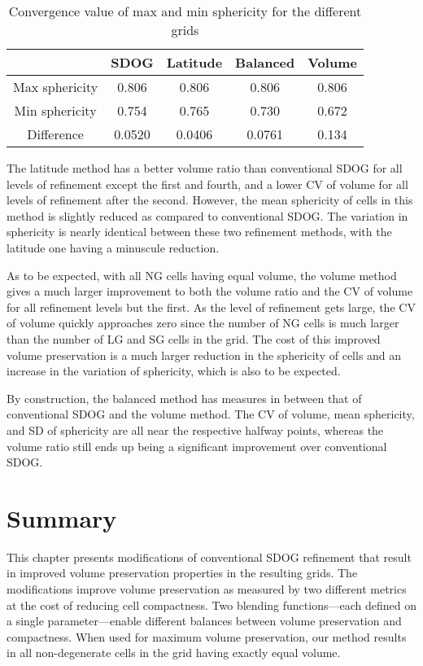 \begin{table}[htp!]
	\centering
	\caption[Convergence values of max and min sphericity for the different grids]{
		Convergence value of max and min sphericity for the different grids
	}
	\begin{tabular}{@{} c c c c c @{}}
		\toprule
		& SDOG   & Latitude & Balanced & Volume \\ \midrule
		Max sphericity & 0.806  & 0.806    & 0.806    & 0.806  \\
		Min sphericity & 0.754  & 0.765    & 0.730    & 0.672  \\
		Difference     & 0.0520 & 0.0406   & 0.0761   & 0.134  \\ \bottomrule
	\end{tabular}
	\label{tab:results-sph}
\end{table}


The latitude method has a better volume ratio than conventional SDOG for all levels of refinement except the first and fourth, and a lower CV of volume for all levels of refinement after the second.
However, the mean sphericity of cells in this method is slightly reduced as compared to conventional SDOG.
The variation in sphericity is nearly identical between these two refinement methods, with the latitude one having a minuscule reduction.


As to be expected, with all NG cells having equal volume, the volume method gives a much larger improvement to both the volume ratio and the CV of volume for all refinement levels but the first.
As the level of refinement gets large, the CV of volume quickly approaches zero since the number of NG cells is much larger than the number of LG and SG cells in the grid.
The cost of this improved volume preservation is a much larger reduction in the sphericity of cells and an increase in the variation of sphericity, which is also to be expected.


By construction, the balanced method has measures in between that of conventional SDOG and the volume method.
The CV of volume, mean sphericity, and SD of sphericity are all near the respective halfway points, whereas the volume ratio still ends up being a significant improvement over conventional SDOG.

\section{Summary}
This chapter presents modifications of conventional SDOG refinement that result in improved volume preservation properties in the resulting grids.
The modifications improve volume preservation as measured by two different metrics at the cost of reducing cell compactness.
Two blending functions---each defined on a single parameter---enable different balances between volume preservation and compactness.
When used for maximum volume preservation, our method results in all non-degenerate cells in the grid having exactly equal volume.
